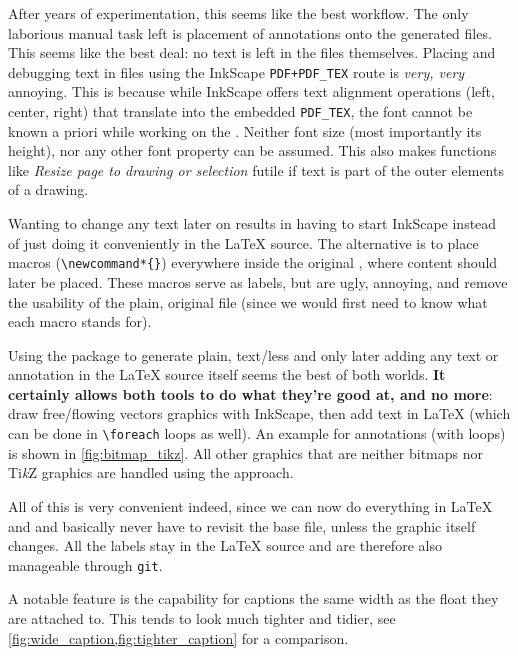\begin{description}
        After years of experimentation, this seems like the best workflow.
        The only laborious manual task left is placement of annotations onto the
        generated  files.
        This seems like the best deal: no text is left in the
         files themselves.
        Placing and debugging text in  files using
        the InkScape \textrightarrow{} \verb|PDF+PDF_TEX| route is \emph{very, very}
        annoying.
        This is because while InkScape offers text alignment operations
        (left, center, right) that translate into the embedded \verb|PDF_TEX|,
        the font cannot be known a priori while working on the
        .
        Neither font size (most importantly its height), nor any other font
        property can be assumed.
        This also makes functions like \emph{Resize page to drawing or selection}
        futile if text is part of the outer elements of a drawing.

        Wanting to change any text later on results in having to start InkScape
        instead of just doing it conveniently in the \LaTeX{} source.
        The alternative is to place macros (\verb|\newcommand*{}|) everywhere
        inside the original , where content should
        later be placed.
        These macros serve as labels, but are ugly, annoying, and remove the
        usability of the plain, original  file
        (since we would first need to know what each macro stands for).

        Using the  package to generate plain, text\-/less
         and only later adding any
        text or annotation in the \LaTeX{} source itself seems the best of both
        worlds.
        \textbf{It certainly allows both tools to do what they're good at, and no more}:
        draw free\-/flowing vectors graphics with InkScape, then add text in
        \LaTeX{} (which can be done in \verb|\foreach| loops as well).
        An example for annotations (with loops) is shown in \cref{fig:bitmap_tikz}.
        All other graphics that are neither bitmaps nor Ti\textit{k}Z graphics are
        handled using the  approach.

        All of this is very convenient indeed, since we can now do everything in
        \LaTeX{} and  and basically never have to revisit the base
         file, unless the graphic itself changes.
        All the labels stay in the \LaTeX{} source and are therefore also manageable
        through \texttt{git}.
    \item[\ctanpackage{floatrow}]
        A notable feature is the capability for captions the same width as the
        float they are attached to.
        This tends to look much tighter and tidier, see
        \cref{fig:wide_caption,fig:tighter_caption} for a comparison.


\end{description}
